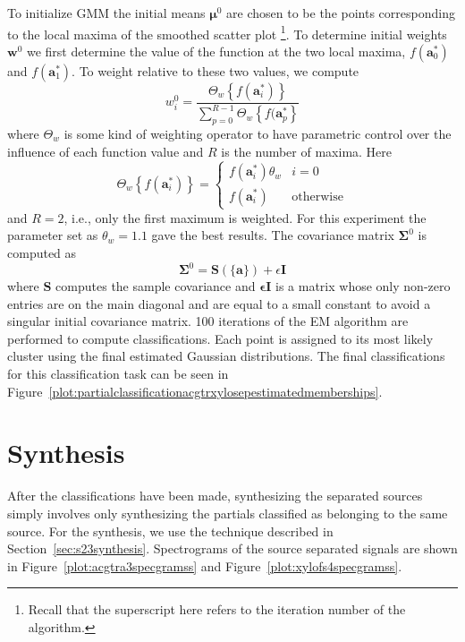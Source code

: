 To initialize GMM the initial means $\boldsymbol{\mu}^{0}$ are chosen to be the
points corresponding to the local maxima of the smoothed scatter plot%
\footnote{Recall that the superscript here refers to the iteration number of the
algorithm.}. To
determine initial weights $\boldsymbol{w}^{0}$ we first determine the value of
the function at the two local maxima, $f(\boldsymbol{a}_{0}^{\ast})$ and
$f(\boldsymbol{a}_{1}^{\ast})$. To weight relative to these two values, we
compute
\[
    w_{i}^{0} = \frac{\Theta_{w} \left\{ f(\boldsymbol{a}_{i}^{\ast}) \right\}}{
    \sum_{p=0}^{R-1}\Theta_{w} \left\{ f(\boldsymbol{a}_{p}^{\ast} \right\}}
\]
where $\Theta_{w}$ is some kind of weighting operator to have parametric control
over the influence of each function value and $R$ is the number of maxima. Here
\[
    \Theta_{w} \left\{ f(\boldsymbol{a}_{i}^{\ast}) \right\}
    = \begin{cases}
        f(\boldsymbol{a}_{i}^{\ast}) \theta_{w} & i = 0 \\
        f(\boldsymbol{a}_{i}^{\ast}) & \text{otherwise}
    \end{cases}
\]
and $R = 2$, i.e., only the first maximum is weighted. For this experiment the parameter set as $\theta_{w} = 1.1$ gave
the best results. The covariance matrix $\boldsymbol{\Sigma}^{0}$ is computed as
\[
    \boldsymbol{\Sigma}^{0} = \boldsymbol{S}(\{ \boldsymbol{a} \}) +
    \epsilon\boldsymbol{I}
\]
where $\boldsymbol{S}$ computes the sample covariance and
$\boldsymbol{\epsilon}\boldsymbol{I}$ is a matrix whose only non-zero entries
are on the main diagonal and are equal to a small constant to avoid a singular
initial covariance matrix. 100 iterations of the EM algorithm are performed to
compute classifications. Each point is assigned to its most likely cluster using
the final estimated Gaussian distributions. The final classifications for this
classification task can be seen in
Figure~\ref{plot:partialclassificationacgtrxylosepestimatedmemberships}.

\section{Synthesis}

After the classifications have been made, synthesizing the separated sources
simply involves only synthesizing the partials classified as belonging to the
same source. For the synthesis, we use the technique described in
Section~\ref{sec:s23synthesis}. Spectrograms of the source separated signals
are shown in Figure~\ref{plot:acgtra3specgramss} and
Figure~\ref{plot:xylofs4specgramss}. 

